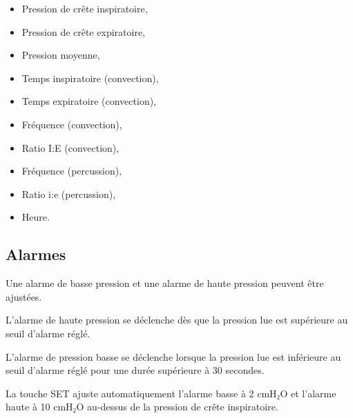 \begin{itemize}
\item Pression de crête inspiratoire,
\item Pression de crête expiratoire,
\item Pression moyenne,
\item Temps inspiratoire (convection),
\item Temps expiratoire (convection),
\item Fréquence (convection),
\item Ratio I:E (convection),
\item Fréquence (percussion),
\item Ratio i:e (percussion),
\item Heure.
\end{itemize}

\subsection{Alarmes}

Une alarme de basse pression et une alarme de haute pression peuvent être ajustées.

L’alarme de haute pression se déclenche dès que la pression lue est supérieure au seuil d’alarme réglé.

L’alarme de pression basse se déclenche lorsque la pression lue est inférieure au seuil d’alarme réglé pour une durée supérieure à 30 secondes.

La touche SET ajuste automatiquement l’alarme basse à 2 cmH₂O et l’alarme haute à 10 cmH₂O au-dessus de la pression de crête inspiratoire.
